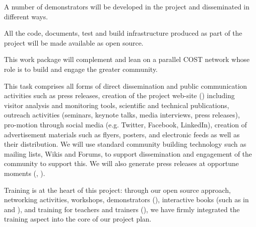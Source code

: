 \begin{workpackage}
\begin{wpdescription}
  A number of demonstrators will be developed in the project and
  disseminated in different ways.

  All the code, documents, test and build infrastructure produced as
  part of the project will be made available as open source.

  This work package will complement and lean on a parallel COST
  network whose role is to build and engage the greater community.
\end{wpdescription}

\begin{tasklist}

\begin{task}[title=Dissemination and Communication activities, lead=PS, partners={SA}, id=dissemination-communication, PM=11, wphases=0-48 ]

  This task comprises all forms of direct dissemination and public
  communication activities such as press releases, creation of the
  project web-site () including visitor analysis and monitoring tools,
  scientific and technical publications, outreach activities
  (seminars, keynote talks, media interviews, press releases),
  pro-motion through social media (e.g. Twitter, Facebook, LinkedIn),
  creation of advertisement materials such as flyers, posters, and
  electronic feeds as well as their distribution. We will use standard
  community building technology such as mailing lists, Wikis and
  Forums, to support dissemination and engagement of the community to
  support this. We will also generate press releases at opportune
  moments (, ). %


\end{task}

\begin{task}[title=Training and training portal,
id=training-portal,lead=PS,PM=1,wphases=0-1] 
Training is at the heart of this project: through our open source
approach, networking activities, workshops, demonstrators
(), interactive books (such
as in  and
), and training for teachers and trainers
(), we have firmly integrated the training
aspect into the core of our project plan.


\end{task}
\end{tasklist}
\end{workpackage}
